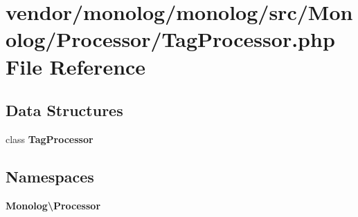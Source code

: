 \section{vendor/monolog/monolog/src/\+Monolog/\+Processor/\+Tag\+Processor.php File Reference}
\label{_tag_processor_8php}
\subsection*{Data Structures}
\begin{DoxyCompactItemize}
\item 
class {\bf Tag\+Processor}
\end{DoxyCompactItemize}
\subsection*{Namespaces}
\begin{DoxyCompactItemize}
\item 
 {\bf Monolog\textbackslash{}\+Processor}
\end{DoxyCompactItemize}
